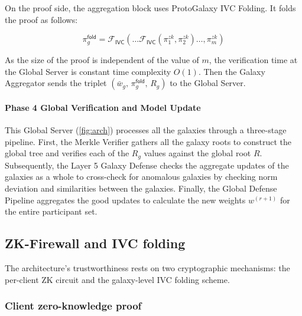 \documentclass[10pt,twocolumn,letterpaper]{article}
\begin{document}
On the proof side, the aggregation block uses ProtoGalaxy IVC Folding. It folds the proof as follows:
~\cite{eagen2023protogalaxy}

\begin{equation}
\label{eq:ivc_fold_def}
\pi_g^{\mathsf{fold}} = \mathcal{F}_{\mathsf{IVC}}\!\left(\dots\mathcal{F}_{\mathsf{IVC}}(\pi_1^{zk}, \pi_2^{zk})\dots, \pi_m^{zk}\right)
\end{equation}

As the size of the proof is independent of the value of $m$, the verification time at the Global Server is constant time complexity $O(1)$. Then the Galaxy Aggregator sends the triplet $(\bar{w}_g,\, \pi_g^{\mathsf{fold}},\, R_g)$  to the Global Server.

\paragraph{Phase 4  Global Verification and Model Update}

This Global Server (\cref{fig:arch}) processes all the galaxies through a three-stage pipeline. First, the Merkle Verifier gathers all the galaxy roots to construct the global tree and verifies each of the $R_g$ values against the global root $R$. Subsequently, the Layer 5 Galaxy Defense checks the aggregate updates of the galaxies as a whole to cross-check for anomalous galaxies by checking norm deviation and similarities between the galaxies. Finally, the Global Defense Pipeline aggregates the good updates to calculate the new weights $w^{(r+1)}$ for the entire participant set.


\subsection{ZK-Firewall and IVC folding}
\label{sec:zkp}

The architecture's trustworthiness rests on two cryptographic mechanisms: the per-client ZK circuit and the galaxy-level IVC folding scheme.

\subsubsection{Client zero-knowledge proof}
\end{document}
